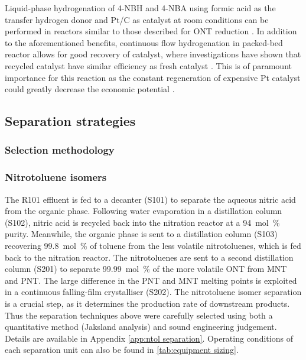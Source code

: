 Liquid-phase hydrogenation of 4-NBH and 4-NBA using formic acid as the transfer hydrogen donor and Pt/C as catalyst at room conditions can be performed in reactors similar to those described for ONT reduction . In addition to the aforementioned benefits, continuous flow hydrogenation in packed-bed reactor allows for good recovery of catalyst, where investigations have shown that recycled catalyst have similar efficiency as fresh catalyst \cite{rahman_fast_2020}. This is of paramount importance for this reaction as the constant regeneration of expensive Pt catalyst could greatly decrease the economic potential \cite{rahman_fast_2020}. 





\subsection{Separation strategies}

\subsubsection{Selection methodology}

\subsubsection{Nitrotoluene isomers}

The R101 effluent is fed to a decanter (S101) to separate the aqueous nitric acid from the organic phase. Following water evaporation in a distillation column (S102), nitric acid is recycled back into the nitration reactor at a \SI{94}{mol\percent} purity.
Meanwhile, the organic phase is sent to a distillation column (S103) recovering \SI{99.8}{mol\percent} of toluene from the less volatile nitrotoluenes, which is fed back to the nitration reactor. The nitrotoluenes are sent to a second distillation column (S201) to separate \SI{99.99}{mol\percent} of the more volatile ONT from MNT and PNT. The large difference in the PNT and MNT melting points is exploited in a continuous falling-film crystalliser (S202). 
The nitrotoluene isomer separation is a crucial step, as it determines the production rate of downstream products. Thus the separation techniques above were carefully selected using both a quantitative method (Jaksland analysis) \cite{jaksland_separation_1995} and sound engineering judgement. Details are available in Appendix \ref{app:ntol separation}. Operating conditions of each separation unit can also be found in \cref{tab:equipment sizing}. 

